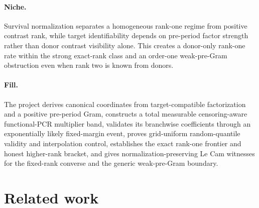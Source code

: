 \documentclass{article}
\begin{document}
\paragraph{Niche.} Survival normalization separates a homogeneous rank-one regime from positive contrast rank, while target identifiability depends on pre-period factor strength rather than donor contrast visibility alone. This creates a donor-only rank-one rate within the strong exact-rank class and an order-one weak-pre-Gram obstruction even when rank two is known from donors.

\paragraph{Fill.} The project derives canonical coordinates from target-compatible factorization and a positive pre-period Gram, constructs a total measurable censoring-aware functional-PCR multiplier band, validates its branchwise coefficients through an exponentially likely fixed-margin event, proves grid-uniform random-quantile validity and interpolation control, establishes the exact rank-one frontier and honest higher-rank bracket, and gives normalization-preserving Le Cam witnesses for the fixed-rank converse and the generic weak-pre-Gram boundary.

\section{Related work}
\end{document}
